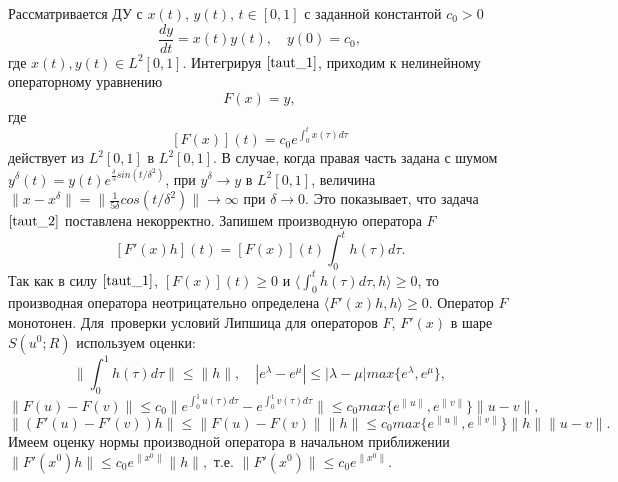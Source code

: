 Рассматривается ДУ с $x(t)$, $y(t)$, $t\in[0, 1]$ с заданной константой $c_0>0$
\begin{equation}\label{taut_1}
\frac{dy}{dt}=x(t)y(t), \quad y(0)=c_0,
\end{equation}
где $x(t), y(t)\in L^2[0,1]$. Интегрируя $\eqref{taut_1}$, приходим к нелинейному операторному уравнению
\begin{equation}\label{taut_2}
F(x)=y,
\end{equation}
где $$[F(x)](t)=c_0 e^{\int_{0}^{t}x(\tau)d\tau}$$
действует из $L^2[0,1]$ в $L^2[0,1]$. В случае, когда правая часть задана с шумом $y^\delta(t)=y(t)e^{\frac{\delta}{5} sin(t/{\delta}^2)}$, при $y^\delta\to y$ в $L^2[0,1]$, величина \\ $\|x-x^\delta\|=\|\frac{1}{5 \delta}cos(t/{\delta}^2)\|\to\infty$ при $\delta\to 0$. Это показывает, что задача $\eqref{taut_2}$ поставлена некорректно. Запишем производную оператора $F$
\begin{equation}\label{taut_3}
[F'(x)h](t)=[F(x)](t)\int_{0}^{t}h(\tau)d\tau.
\end{equation}
Так как в силу $\eqref{taut_1}$, $[F(x)](t)\ge 0$ и $\langle\int_{0}^{t}h(\tau)d\tau, h\rangle\ge 0$, то производная оператора неотрицательно определена $\langle F'(x)h, h\rangle\ge 0$. Оператор $F$ монотонен. Для~проверки условий Липшица для операторов $F$, $F'(x)$ в шаре $S(u^0; R)$ используем оценки: $$\|\int_{0}^{1}h(\tau)d\tau \|\le\|h\|,\quad |e^\lambda-e^\mu|\le|\lambda-\mu|max\{e^\lambda, e^\mu\},$$
$$\|F(u)-F(v)\|\le c_0\|e^{\int_{0}^{1}u(\tau)d\tau}-e^{\int_{0}^{1}v(\tau)d\tau}\|
\le c_0 max\{e^{\|u\|},e^{\|v\|}\}\|u-v\|,$$
$$\|(F'(u)-F'(v))h\|\le\|F(u)-F(v)\|\|h\|\le c_0 max\{e^{\|u\|},e^{\|v\|}\}\|h\|\|u-v\|.$$
Имеем оценку нормы производной оператора в начальном приближении\\ $\|F'(x^0)h\|\le c_0 e^{\|x^0\|}\|h\|,$ т.е. $\|F'(x^0)\|\le c_0 e^{\|x^0\|}$.%

